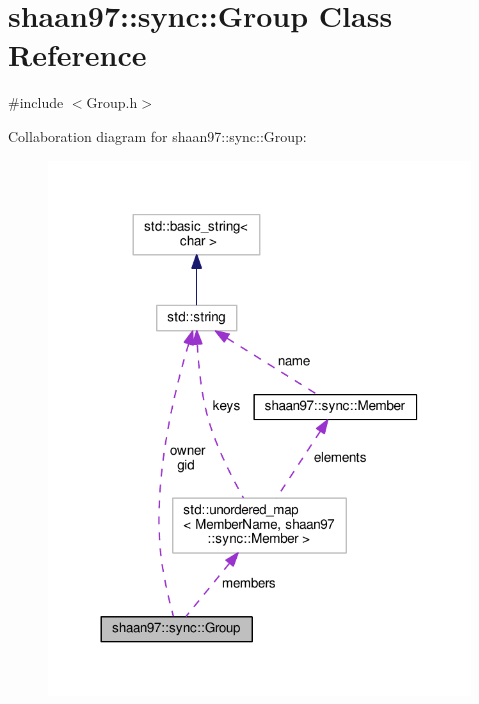 \hypertarget{classshaan97_1_1sync_1_1_group}{}\section{shaan97\+:\+:sync\+:\+:Group Class Reference}
\label{classshaan97_1_1sync_1_1_group}


{\ttfamily \#include $<$Group.\+h$>$}



Collaboration diagram for shaan97\+:\+:sync\+:\+:Group\+:
\nopagebreak
\begin{figure}[H]
\begin{center}
\leavevmode
\includegraphics[width=317pt]{classshaan97_1_1sync_1_1_group__coll__graph}
\end{center}
\end{figure}
